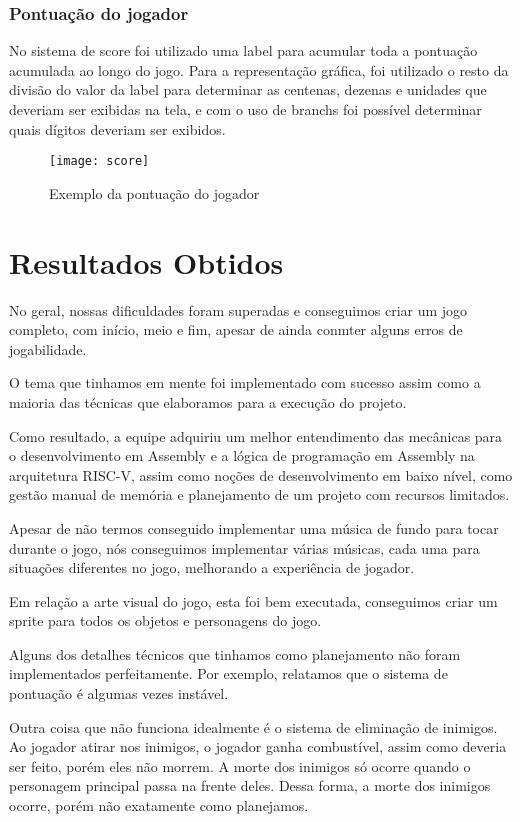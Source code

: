 \documentclass[conference]{IEEEtran}
\begin{document}
\subsubsection{Pontuação do jogador}
No sistema de score foi utilizado uma label para acumular toda a pontuação acumulada ao longo do jogo. Para a representação gráfica, foi utilizado o resto da divisão do valor da label para determinar as centenas, dezenas e unidades que deveriam ser exibidas na tela, e com o uso de branchs foi possível determinar quais dígitos deveriam ser exibidos.

\begin{figure}[h]
\centering
\texttt{[image: score]}
\caption{Exemplo da pontuação do jogador}
\end{figure}  

\section{Resultados Obtidos}
No geral, nossas dificuldades foram superadas e conseguimos criar um jogo completo, com início, meio e fim, apesar de ainda conmter alguns erros de jogabilidade. 

O tema que tinhamos em mente foi implementado com sucesso assim como a maioria das técnicas que elaboramos para a execução do projeto. 

Como resultado, a equipe adquiriu um melhor entendimento das mecânicas para o desenvolvimento em Assembly e a lógica de programação em Assembly na arquitetura RISC-V, assim como noções de desenvolvimento em baixo nível, como gestão manual de memória e planejamento de um projeto com recursos limitados.

Apesar de não termos conseguido implementar uma música de fundo para tocar durante o jogo, nós conseguimos implementar várias músicas, cada uma para situações diferentes no jogo, melhorando a experiência de jogador.

Em relação a arte visual do jogo, esta foi bem executada, conseguimos criar um sprite\textsuperscript{\cite{b7}} para todos os objetos e personagens do jogo. 

Alguns dos detalhes técnicos que tinhamos como planejamento não foram implementados perfeitamente. Por exemplo, relatamos que o sistema de pontuação é algumas vezes instável. 

Outra coisa que não funciona idealmente é o sistema de eliminação de inimigos. Ao jogador atirar nos inimigos, o jogador ganha combustível, assim como deveria ser feito, porém eles não morrem. A morte dos inimigos só ocorre quando o personagem principal passa na frente deles. Dessa forma, a morte dos inimigos ocorre, porém não exatamente como planejamos.
\end{document}
